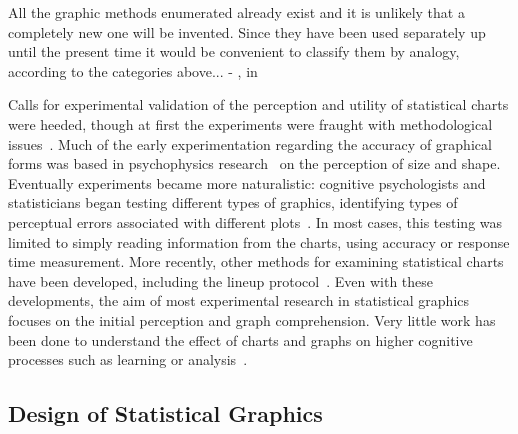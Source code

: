 \documentclass[letterpaper]{ar-1col}\usepackage[]{graphicx}\usepackage[]{color}
\newcommand{\todo}[1]{\textcolor{pink}{#1}}
\begin{document}
\begin{marginnote}
All the graphic methods enumerated already exist and it is unlikely that
a completely new one will be invented. Since they have been used separately
up until the present time it would be convenient to classify them by analogy,
according to the categories above...
- \citet{EmploiCartographieMethode1858}, in \citet{funkhouserHistoricalDevelopmentGraphical1937}
\end{marginnote}


Calls for experimental validation of the perception and utility of statistical charts were heeded, though at first the experiments were fraught with methodological issues~\citep{croxtonBarChartsCircle1927}. Much of the early experimentation regarding the accuracy of graphical forms was based in psychophysics research~\citep{teghtsoonian_judgment_1965} on the perception of size and shape. Eventually experiments became more naturalistic: cognitive psychologists and statisticians began testing different types of graphics, identifying types of perceptual errors associated with different plots~\citep{spenceVisualPsychophysicsSimple1990,cleveland_graphical_1985}. In most cases, this testing was limited to simply reading information from the charts, using accuracy or response time measurement. More recently, other methods for examining statistical charts have been developed, including the lineup protocol~\citep{wickhamGraphicalInferenceInfovis2010}. Even with these developments, the aim of most experimental research in statistical graphics focuses on the initial perception and graph comprehension. Very little work has been done to understand the effect of charts and graphs on higher cognitive processes such as learning or analysis~\citep{greenPersonalEquationComplex2011}.

\subsection{Design of Statistical Graphics}
\end{document}
